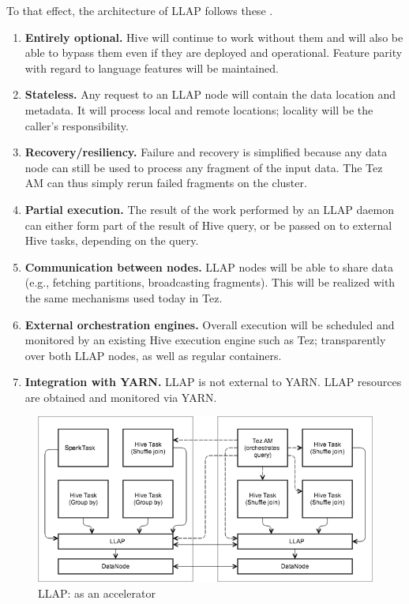 To that effect, the architecture of LLAP follows these .

\begin{enumerate}
\item \textbf{Entirely optional.} Hive will continue to work without them and will also be able to bypass them even if they are deployed and operational.  Feature parity with regard to language features will be maintained. 
\item \textbf{Stateless.} Any request to an LLAP node will contain the data location and metadata. It will process local and remote locations; locality will be the caller’s responsibility.
\item \textbf{Recovery/resiliency.} Failure and recovery is simplified because any data node can still be used to process any fragment of the input data. The Tez AM can thus simply rerun failed fragments on the cluster.
\item \textbf{Partial execution.} The result of the work performed by an LLAP daemon can either form part of the result of Hive query, or be passed on to external Hive tasks, depending on the query.
\item \textbf{Communication between nodes.} LLAP nodes will be able to share data (e.g., fetching partitions, broadcasting fragments). This will be realized with the same mechanisms used today in Tez.
\item \textbf{External orchestration engines.} Overall execution will be scheduled and monitored by an existing Hive execution engine such as Tez; transparently over both LLAP nodes, as well as regular containers.  
\item \textbf{Integration with YARN.} LLAP is not external to YARN. LLAP resources are obtained and monitored via YARN. 
\end{enumerate}

\begin{figure}[t]
\centering
\includegraphics[width=0.8\columnwidth]{figures/arch1.png}
\caption{LLAP: as an accelerator}
\label{fig:arch1}
\end{figure} 

